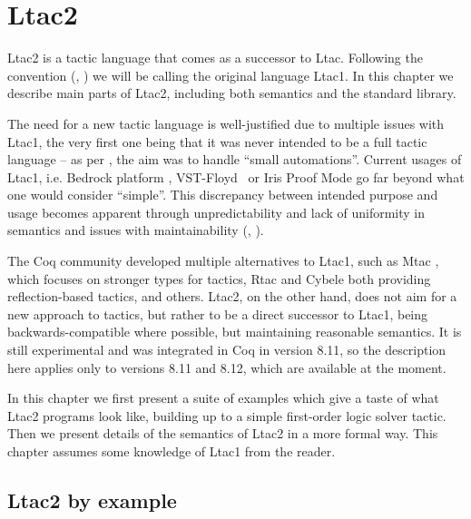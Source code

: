\chapter{Ltac2}

Ltac2 is a tactic language that comes as a successor to Ltac.
Following the convention (\cite[Section 3.3.2]{thecoqdevelopmentteamCoqProofAssistant2020}, \cite{pedrotLtac2TacticalWarfare2019}) we will be calling the original language Ltac1.
In this chapter we describe main parts of Ltac2, including both semantics and the standard library.

The need for a new tactic language is well-justified due to multiple issues with Ltac1, the very first one being that it was never intended to be a full tactic language -- as per \citet{pedrotCoqHoTTminuteTickingClockwork2016}, the aim was to handle ``small automations''.
Current usages of Ltac1, i.e. Bedrock platform \cite{chlipalaMostlyautomatedVerificationLowlevel2011}, VST-Floyd~\cite{caoVSTFloydSeparationLogic2018} or Iris Proof Mode \cite{krebbersInteractiveProofsHigherorder2017, krebbersMoSeLGeneralExtensible2018} go far beyond what one would consider ``simple''.
This discrepancy between intended purpose and usage becomes apparent through unpredictability and lack of uniformity in semantics and issues with maintainability (\cite[Section 3.3.2]{thecoqdevelopmentteamCoqProofAssistant2020}, \cite{pedrotLtac2TacticalWarfare2019}).

The Coq community developed multiple alternatives to Ltac1, such as Mtac \cite*{zilianiMtacMonadTyped2013, kaiserMtac2TypedTactics2018a}, which focuses on stronger types for tactics,
Rtac \cite{malechaExtensibleEfficientAutomation2016} and Cybele \cite{claretLightweightProofReflection2013} both providing reflection-based tactics, and others.
Ltac2, on the other hand, does not aim for a new approach to tactics, but rather to be a direct successor to Ltac1, being backwards-compatible where possible, but maintaining reasonable semantics.
It is still experimental and was integrated in Coq in version 8.11, so the description here applies only to versions 8.11 and 8.12, which are available at the moment.

In this chapter we first present a suite of examples which give a taste of what Ltac2 programs look like, building up to a simple first-order logic solver tactic.
Then we present details of the semantics of Ltac2 in a more formal way.
This chapter assumes some knowledge of Ltac1 from the reader.

\section{Ltac2 by example}
\label{sec:ltac2-by-examples}

